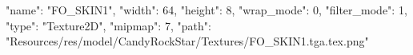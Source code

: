 {
  "name": "FO_SKIN1",
  "width": 64,
  "height": 8,
  "wrap_mode": 0,
  "filter_mode": 1,
  "type": "Texture2D",
  "mipmap": 7,
  "path": "Resources/res/model/CandyRockStar/Textures/FO_SKIN1.tga.tex.png"
}